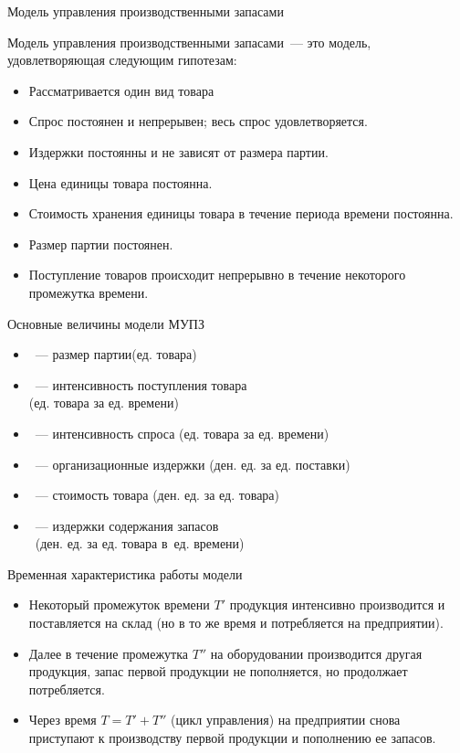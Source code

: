 \documentclass[unicode,11pt,notheorems,xcolor=table]{beamer}
\begin{document}
\begin{frame}{Модель управления производственными запасами}
    

    \alert{Модель управления производственными запасами}~--- это 
    модель, удовлетворяющая следующим гипотезам:
    \begin{itemize}
    \item Рассматривается один вид товара
    \item Спрос постоянен и непрерывен; весь спрос удовлетворяется.
    \item Издержки постоянны и не зависят от размера партии.
    \item Цена единицы товара постоянна. 
    \item Стоимость хранения единицы товара в течение периода времени постоянна.
    \item Размер партии постоянен. 
    \item \alert{Поступление товаров происходит непрерывно в течение некоторого промежутка времени.}
\end{itemize}
\end{frame}


\begin{frame}{Основные величины модели МУПЗ}
    \begin{itemize}
        \item {}~--- размер партии\hfill (ед. товара)
        \item \structure{$\lambda$}~--- интенсивность поступления товара \\ \hfill
        (ед. товара за ед. времени)
        \item {}~--- интенсивность спроса  \hfill
            (ед. товара за ед. времени)
        \item {}~--- организационные издержки \hfill (ден. ед. за ед. поставки)
        \item  {}~--- стоимость товара \hfill  (ден. ед. за ед. товара)
        \item {}~--- издержки содержания запасов \\~\hfill (ден. ед. за ед. товара в~ед. времени)

    \end{itemize}
    \end{frame}
    \begin{frame}{Временная характеристика работы модели}{}
        \begin{itemize}
            \item Некоторый промежуток времени $T'$ продукция интенсивно производится и поставляется на склад (но в то же время и потребляется на предприятии). 
            \item Далее в течение промежутка $T''$ на оборудовании производится другая продукция, запас первой продукции не пополняется, но продолжает  потребляется. 
            \item Через время $T = T' + T''$ (цикл управления) на предприятии снова приступают к производству первой продукции и пополнению ее запасов.
        \end{itemize}
    \end{frame}
\end{document}
